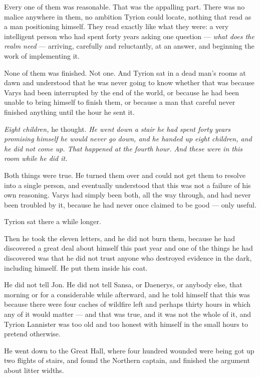 Every one of them was reasonable. That was the appalling part. There was no malice anywhere in them, no ambition Tyrion could locate, nothing that read as a man positioning himself. They read exactly like what they were: a very intelligent person who had spent forty years asking one question — \textit{what does the realm need} — arriving, carefully and reluctantly, at an answer, and beginning the work of implementing it.

None of them was finished. Not one. And Tyrion sat in a dead man’s rooms at dawn and understood that he was never going to know whether that was because Varys had been interrupted by the end of the world, or because he had been unable to bring himself to finish them, or because a man that careful never finished anything until the hour he sent it.

\textit{Eight children,} he thought. \textit{He went down a stair he had spent forty years promising himself he would never go down, and he handed up eight children, and he did not come up. That happened at the fourth hour. And these were in this room while he did it.}

Both things were true. He turned them over and could not get them to resolve into a single person, and eventually understood that this was not a failure of his own reasoning. Varys had simply been both, all the way through, and had never been troubled by it, because he had never once claimed to be good — only useful.

Tyrion sat there a while longer.

Then he took the eleven letters, and he did not burn them, because he had discovered a great deal about himself this past year and one of the things he had discovered was that he did not trust anyone who destroyed evidence in the dark, including himself. He put them inside his coat.

He did not tell Jon. He did not tell Sansa, or Daenerys, or anybody else, that morning or for a considerable while afterward, and he told himself that this was because there were four caches of wildfire left and perhaps thirty hours in which any of it would matter — and that was true, and it was not the whole of it, and Tyrion Lannister was too old and too honest with himself in the small hours to pretend otherwise.

He went down to the Great Hall, where four hundred wounded were being got up two flights of stairs, and found the Northern captain, and finished the argument about litter widths.